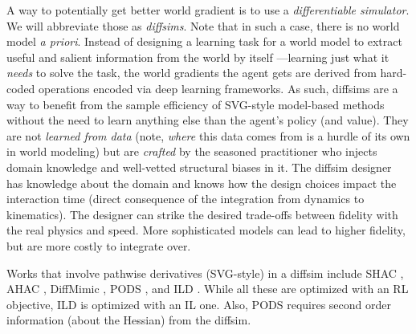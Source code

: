 \documentclass[12pt,a4paper]{article}
\begin{document}
A way to potentially get better world gradient is to use a \emph{differentiable simulator}.
We will abbreviate those as \textit{diffsims}.
Note that in such a case, there is no world model \textit{a priori}.
Instead of designing a learning task for a world model to extract useful and salient information
from the world by itself ---learning just what it \emph{needs} to solve the task,
the world gradients the agent gets are derived from hard-coded operations encoded via
deep learning frameworks.
As such, diffsims are a way to benefit from the sample efficiency of SVG-style model-based methods
without the need to learn anything else than the agent's policy (and value).
They are not \textit{learned from data} (note, \textit{where} this data comes from is a hurdle
of its own in world modeling) but are \textit{crafted} by the seasoned practitioner
who injects domain knowledge and well-vetted structural biases in it.
The diffsim designer has knowledge about the domain and knows how the design choices impact
the interaction time (direct consequence of the integration from dynamics to kinematics).
The designer can strike the desired trade-offs between fidelity with the real physics and speed.
More sophisticated models can lead to higher fidelity, but are more costly to integrate over.

Works that involve pathwise derivatives (SVG-style) in a diffsim include
SHAC \cite{}, AHAC \cite{}, DiffMimic \cite{},
PODS \cite{}, and ILD \cite{}.
While all these are optimized with an RL objective, ILD is optimized with an IL one.
Also, PODS requires second order information (about the Hessian) from the diffsim.
\end{document}
